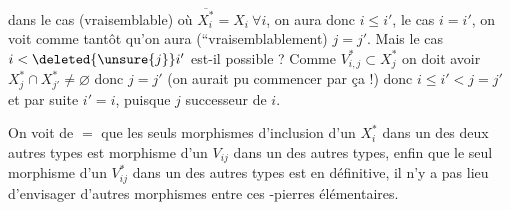 dans le cas (vraisemblable) où $\overline{X_i^*}=X_i\ \forall i$, on aura donc $i\leq i'$,  le cas $i=i'$, on voit comme tantôt qu'on aura (``vraisemblablement) $j=j'$. Mais le cas $i<\deleted{\unsure{j}}i'$ est-il possible ? Comme $V_{i,j}^*\subset X_j^*$  on doit avoir $X_j^*\cap X_{j'}^*\ne\varnothing$ donc $j=j'$ (on aurait pu commencer par ça !)
donc  $i\leq i'<j=j'$ et par suite $i'=i$, puisque $j$ successeur de $i$.

On voit de $=$ que les seuls morphismes d'inclusion d'un $X_i^*$ dans un des deux autres types est
  morphisme d'un $V_{ij}$ dans un des autres types,  enfin que le seul morphisme d'un $V_{ij}^*$ dans un des autres types est
en définitive, il n'y a pas lieu d'envisager d'autres morphismes entre ces  -pierres élémentaires.
